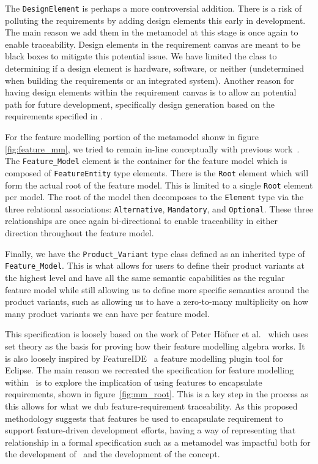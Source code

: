 The \texttt{DesignElement} is perhaps a more controversial addition. There is a risk of polluting the requirements by adding design elements this early in development. The main reason we add them in the metamodel at this stage is once again to enable traceability. Design elements in the requirement canvas are meant to be black boxes to mitigate this potential issue. We have limited the class to determining if a design element is hardware, software, or neither (undetermined when building the requirements or an integrated system). Another reason for having design elements within the requirement canvas is to allow an potential path for future development, specifically design generation based on the requirements specified in \tool.

For the feature modelling portion of the metamodel shonw in figure \ref{fig:feature_mm}, we tried to remain in-line conceptually with previous work~\cite{kang1990feature,kang1998form,kang2002feature}. The \texttt{Feature\_Model} element is the container for the feature model which is composed of \texttt{FeatureEntity} type elements. There is the \texttt{Root} element which will form the actual root of the feature model. This is limited to a single \texttt{Root} element per model. The root of the model then decomposes to the \texttt{Element} type via the three relational associations: \texttt{Alternative}, \texttt{Mandatory}, and \texttt{Optional}. These three relationships are once again bi-directional to enable traceability in either direction throughout the feature model. 

Finally, we have the \texttt{Product\_Variant} type class defined as an inherited type of \texttt{Feature\_Model}. This is what allows for users to define their product variants at the highest level and have all the same semantic capabilities as the regular feature model while still allowing us to define more specific semantics around the product variants, such as allowing us to have a zero-to-many multiplicity on how many product variants we can have per feature model.

This specification is loosely based on the work of Peter H\"{o}fner et al.~\cite{hofner2006feature,hofner2011algebra} which uses set theory as the basis for proving how their feature modelling algebra works. It is also loosely inspired by FeatureIDE~\cite{kastner2009featureide, thum2014featureide} a feature modelling plugin tool for Eclipse. The main reason we recreated the specification for feature modelling within \tool\ is to explore the implication of using features to encapsulate requirements, shown in figure~\ref{fig:mm_root}. This is a key step in the process as this allows for what we dub feature-requirement traceability. As this proposed methodology suggests that features be used to encapsulate requirement to support feature-driven development efforts, having a way of representing that relationship in a formal specification such as a metamodel was impactful both for the development of \tool\ and the development of the concept.

